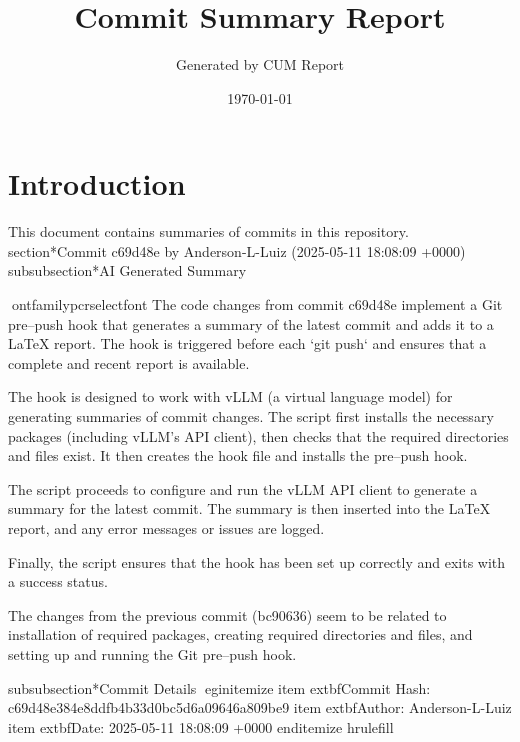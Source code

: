 \documentclass{article}
\title{Commit Summary Report}
\author{Generated by CUM Report}
\date{\today}
\begin{document}
\maketitle
\tableofcontents
\section{Introduction}
This document contains summaries of commits in this repository.
section*{Commit c69d48e by Anderson-L-Luiz (2025-05-11 18:08:09 +0000)}
subsubsection*{AI Generated Summary}
{ontfamily{pcr}selectfont
 The code changes from commit c69d48e implement a Git pre--push hook that generates a summary of the latest commit and adds it to a LaTeX report. The hook is triggered before each `git push` and ensures that a complete and recent report is available.

The hook is designed to work with vLLM (a virtual language model) for generating summaries of commit changes. The script first installs the necessary packages (including vLLM's API client), then checks that the required directories and files exist. It then creates the hook file and installs the pre--push hook.

The script proceeds to configure and run the vLLM API client to generate a summary for the latest commit. The summary is then inserted into the LaTeX report, and any error messages or issues are logged.

Finally, the script ensures that the hook has been set up correctly and exits with a success status.

The changes from the previous commit (bc90636) seem to be related to installation of required packages, creating required directories and files, and setting up and running the Git pre--push hook.
}
subsubsection*{Commit Details}
egin{itemize}
    item 	extbf{Commit Hash:} c69d48e384e8ddfb4b33d0bc5d6a09646a809be9
    item 	extbf{Author:} Anderson-L-Luiz
    item 	extbf{Date:} 2025-05-11 18:08:09 +0000
end{itemize}
hrulefill
\end{document}
